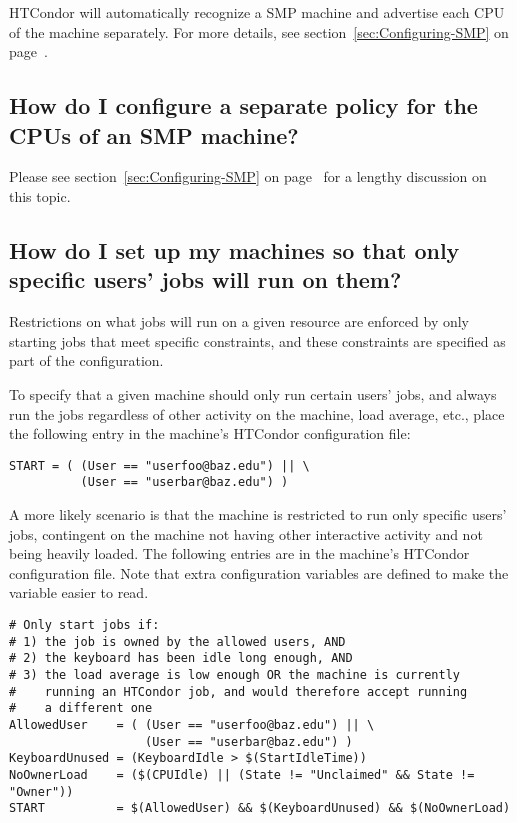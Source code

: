 HTCondor will automatically recognize a SMP machine and advertise each
CPU of the machine separately.
For more details, see section~\ref{sec:Configuring-SMP} on
page~\pageref{sec:Configuring-SMP}.

\subsection*{How do I configure a separate policy for the CPUs of an SMP machine?}

Please see section~\ref{sec:Configuring-SMP} on
page~\pageref{sec:Configuring-SMP} for a lengthy discussion on
this topic.

\subsection*{How do I set up my machines so that only specific users' jobs will run on them?}

Restrictions on what jobs will run on a given resource are
enforced by only starting jobs that meet specific constraints,
and these constraints are specified as part of the configuration.

To specify that a given machine should only run certain users' jobs,
and always run the jobs regardless of other activity on the machine,
load average, etc.,
place the following entry in the
machine's HTCondor configuration file:

\footnotesize
\begin{verbatim}
START = ( (User == "userfoo@baz.edu") || \
          (User == "userbar@baz.edu") )
\end{verbatim}
\normalsize

A more likely scenario is that the machine is restricted to run
only specific users' jobs, contingent on the machine not having
other interactive activity and not being heavily loaded.
The following entries are in the machine's HTCondor configuration file. 
Note that extra configuration variables are defined to make 
the  variable easier to read.

\footnotesize
\begin{verbatim}
# Only start jobs if:
# 1) the job is owned by the allowed users, AND
# 2) the keyboard has been idle long enough, AND
# 3) the load average is low enough OR the machine is currently
#    running an HTCondor job, and would therefore accept running
#    a different one
AllowedUser    = ( (User == "userfoo@baz.edu") || \
                   (User == "userbar@baz.edu") )
KeyboardUnused = (KeyboardIdle > $(StartIdleTime))
NoOwnerLoad    = ($(CPUIdle) || (State != "Unclaimed" && State != "Owner"))
START          = $(AllowedUser) && $(KeyboardUnused) && $(NoOwnerLoad)
\end{verbatim}
\normalsize

